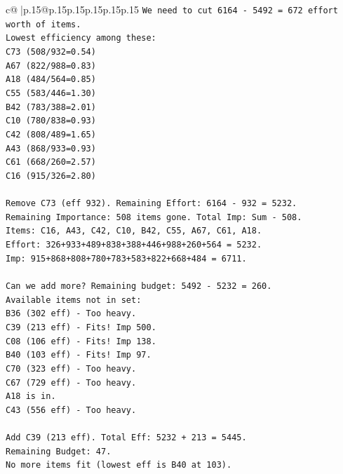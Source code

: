 \documentclass{article}
\begin{document}
{\begin{supertabular}{c@{$\;$}|p{.15\linewidth}@{}p{.15\linewidth}p{.15\linewidth}p{.15\linewidth}p{.15\linewidth}p{.15\linewidth}}
{{{\texttt{We need to cut 6164 {-} 5492 = 672 effort worth of items.} \\
\texttt{Lowest efficiency among these:} \\
\texttt{C73 (508/932=0.54)} \\
\texttt{A67 (822/988=0.83)} \\
\texttt{A18 (484/564=0.85)} \\
\texttt{C55 (583/446=1.30)} \\
\texttt{B42 (783/388=2.01)} \\
\texttt{C10 (780/838=0.93)} \\
\texttt{C42 (808/489=1.65)} \\
\texttt{A43 (868/933=0.93)} \\
\texttt{C61 (668/260=2.57)} \\
\texttt{C16 (915/326=2.80)} \\
\\ 
\texttt{Remove C73 (eff 932). Remaining Effort: 6164 {-} 932 = 5232.} \\
\texttt{Remaining Importance: 508 items gone. Total Imp: Sum {-} 508.} \\
\texttt{Items: C16, A43, C42, C10, B42, C55, A67, C61, A18.} \\
\texttt{Effort: 326+933+489+838+388+446+988+260+564 = 5232.} \\
\texttt{Imp: 915+868+808+780+783+583+822+668+484 = 6711.} \\
\\ 
\texttt{Can we add more? Remaining budget: 5492 {-} 5232 = 260.} \\
\texttt{Available items not in set:} \\
\texttt{B36 (302 eff) {-} Too heavy.} \\
\texttt{C39 (213 eff) {-} Fits! Imp 500.} \\
\texttt{C08 (106 eff) {-} Fits! Imp 138.} \\
\texttt{B40 (103 eff) {-} Fits! Imp 97.} \\
\texttt{C70 (323 eff) {-} Too heavy.} \\
\texttt{C67 (729 eff) {-} Too heavy.} \\
\texttt{A18 is in.} \\
\texttt{C43 (556 eff) {-} Too heavy.} \\
\\ 
\texttt{Add C39 (213 eff). Total Eff: 5232 + 213 = 5445.} \\
\texttt{Remaining Budget: 47.} \\
\texttt{No more items fit (lowest eff is B40 at 103).} \\
}}}
\end{supertabular}}
\end{document}

